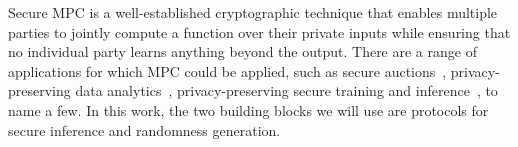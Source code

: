 Secure MPC is a well-established cryptographic technique that enables multiple parties to jointly compute a function over their private inputs while ensuring that no individual party learns anything beyond the output.
There are a range of applications for which MPC could be applied, such as secure auctions~\cite{FC:BCDGJK09}, privacy-preserving data analytics~\cite{prio,FC:BogTalWil12}, privacy-preserving secure training and inference~\cite{C:EGKRS20,CCS:MohRin18}, to name a few. 
In this work, the two building blocks we will use are protocols for secure inference and randomness generation.

